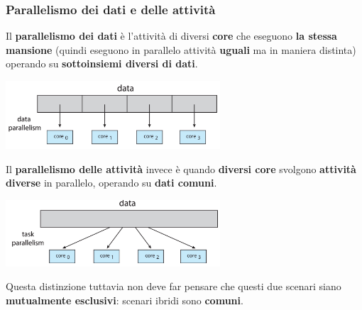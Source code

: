 \documentclass[12pt]{article}
\begin{document}
\subsubsection{Parallelismo dei dati e delle attività}
Il \textbf{parallelismo dei dati} è l'attività di diversi \textbf{core} che eseguono \textbf{la stessa mansione} (quindi eseguono in parallelo attività \textbf{uguali} ma in maniera distinta) operando su \textbf{sottoinsiemi diversi di dati}.
\begin{center}
    \includegraphics[width = 0.60\textwidth]{Images/47.PNG}
\end{center}
Il \textbf{parallelismo delle attività} invece è quando \textbf{diversi core} svolgono \textbf{attività diverse} in parallelo, operando su \textbf{dati comuni}.
\begin{center}
    \includegraphics[width = 0.60\textwidth]{Images/48.PNG}
\end{center}
Questa distinzione tuttavia non deve far pensare che questi due scenari siano \textbf{mutualmente esclusivi}: scenari ibridi sono \textbf{comuni}.
\end{document}
